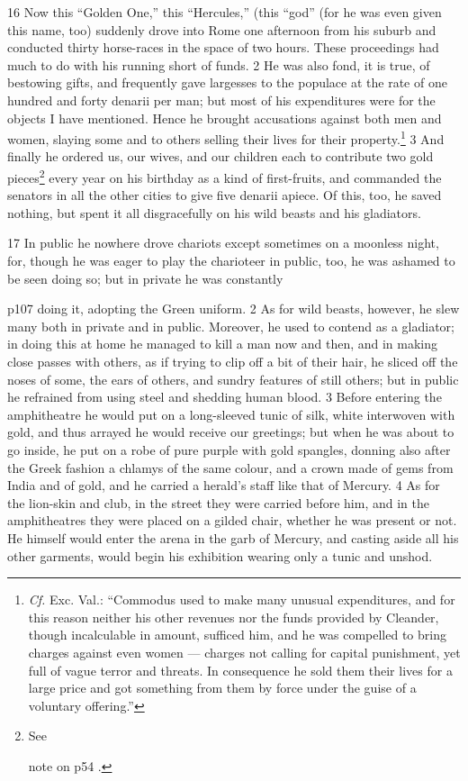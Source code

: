 16
Now this ``Golden One,'' this ``Hercules,'' (this ``god'' (for he was even given this name, too) suddenly drove into Rome one afternoon from his suburb and conducted thirty horse-races in the space of two hours. These proceedings had much to do with his running short of funds. 2 He was also fond, it is true, of bestowing gifts, and frequently gave largesses to the populace at the rate of one hundred and forty denarii per man; but most of his expenditures were for the objects I have mentioned. Hence he brought accusations against both men and women, slaying some and to others selling their lives for their property.\texthebrew{⁠}\footnote{\emph{Cf.} Exc. Val.: ``Commodus used to make many unusual expenditures, and for this reason neither his other revenues nor the funds provided by Cleander, though incalculable in amount, sufficed him, and he was compelled to bring charges against even women \texthebrew{—} charges not calling for capital punishment, yet full of vague terror and threats. In consequence he sold them their lives for a large price and got something from them by force under the guise of a voluntary offering.''

} 3 And finally he ordered us, our wives, and our children each to contribute two gold pieces\texthebrew{⁠}\footnote{See

note on p54 .

} every year on his birthday as a kind of first-fruits, and commanded the senators in all the other cities to give five denarii apiece. Of this, too, he saved nothing, but spent it all disgracefully on his wild beasts and his gladiators.

17
In public he nowhere drove chariots except sometimes on a moonless night, for, though he was eager to play the charioteer in public, too, he was ashamed to be seen doing so; but in private he was constantly

p107 doing it, adopting the Green uniform. 2 As for wild beasts, however, he slew many both in private and in public. Moreover, he used to contend as a gladiator; in doing this at home he managed to kill a man now and then, and in making close passes with others, as if trying to clip off a bit of their hair, he sliced off the noses of some, the ears of others, and sundry features of still others; but in public he refrained from using steel and shedding human blood. 3 Before entering the amphitheatre he would put on a long-sleeved tunic of silk, white interwoven with gold, and thus arrayed he would receive our greetings; but when he was about to go inside, he put on a robe of pure purple with gold spangles, donning also after the Greek fashion a chlamys of the same colour, and a crown made of gems from India and of gold, and he carried a herald's staff like that of Mercury. 4 As for the lion-skin and club, in the street they were carried before him, and in the amphitheatres they were placed on a gilded chair, whether he was present or not. He himself would enter the arena in the garb of Mercury, and casting aside all his other garments, would begin his exhibition wearing only a tunic and unshod.

